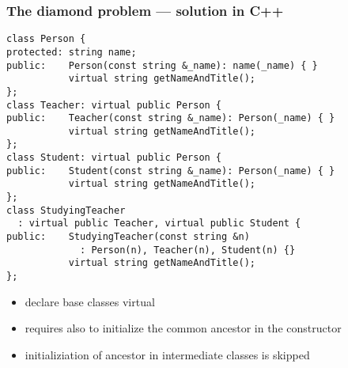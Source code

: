 \documentclass{slides}
\begin{document}
\begin{frame}[fragile]
  \frametitle{The diamond problem --- solution in C++}

\begin{lstlisting}[basicstyle={\ttfamily\tiny},emph={virtual}]
class Person {
protected: string name;
public:    Person(const string &_name): name(_name) { }
           virtual string getNameAndTitle();
};
class Teacher: virtual public Person {
public:    Teacher(const string &_name): Person(_name) { }
           virtual string getNameAndTitle();
};
class Student: virtual public Person {
public:    Student(const string &_name): Person(_name) { }
           virtual string getNameAndTitle();
};
class StudyingTeacher
  : virtual public Teacher, virtual public Student {
public:    StudyingTeacher(const string &n)
             : Person(n), Teacher(n), Student(n) {}
           virtual string getNameAndTitle();
};
\end{lstlisting}

  \begin{itemize}
  \item declare base classes virtual
  \item requires also to initialize the common ancestor in the constructor
  \item initializiation of ancestor in intermediate classes is skipped
  \end{itemize}
\end{frame}
\end{document}
